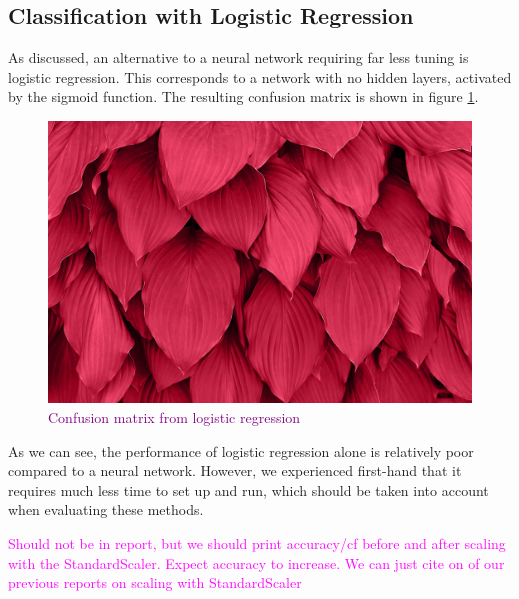 \subsection{Classification with Logistic Regression}
As discussed, an alternative to a neural network requiring far less tuning is logistic regression. This corresponds to a network with no hidden layers, activated by the sigmoid function. The resulting confusion matrix is shown in figure \ref{fig:logreg}. 
\begin{figure}
    \centering
    \includegraphics[width=0.5\linewidth]{figures/placeholders/logreg.png}
    \caption{\textcolor{purple}{Confusion matrix from logistic regression}}
    \label{fig:logreg}
\end{figure}

As we can see, the performance of logistic regression alone is relatively poor compared to a neural network. However, we experienced first-hand that it requires much less time to set up and run, which should be taken into account when evaluating these methods.

\textcolor{magenta}{Should not be in report, but we should print accuracy/cf before and after scaling with the StandardScaler. Expect accuracy to increase. We can just cite on of our previous reports on scaling with StandardScaler}



